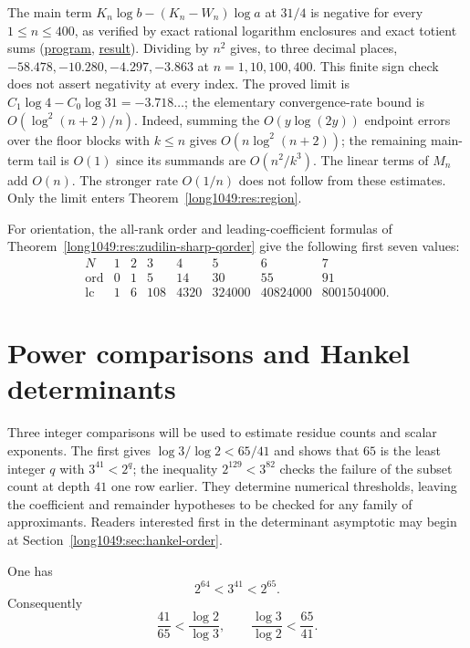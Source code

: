 The main term $K_n\log b-(K_n-W_n)\log a$ at $31/4$ is negative
for every $1\le n\le400$, as verified by exact rational logarithm
enclosures and exact totient sums (\href{https://github.com/wcook04/plectis-erdos/blob/4beca4ad0c00a626def9c73f2420e20ebf8d1968/research/experiments/erdos1049/main_term_31_4.py}{program}, \href{https://github.com/wcook04/plectis-erdos/blob/4beca4ad0c00a626def9c73f2420e20ebf8d1968/research/experiments/erdos1049/receipts/main-term-31-4.json}{result}). Dividing by $n^2$ gives, to three
decimal places, $-58.478,-10.280,-4.297,-3.863$ at
$n=1,10,100,400$. This finite sign check does not assert negativity at
every index. The proved limit is
$C_1\log4-C_0\log31=-3.718\ldots$; the elementary convergence-rate bound
is $O(\log^2(n+2)/n)$.
Indeed, summing the $O(y\log(2y))$ endpoint errors over the floor blocks
with $k\le n$ gives $O(n\log^2(n+2))$; the remaining main-term tail is
$O(1)$ since its summands are $O(n^2/k^3)$.  The linear terms of $M_n$
add $O(n)$.  The stronger rate $O(1/n)$ does not follow from these estimates.  Only the limit enters Theorem~\ref{long1049:res:region}.

For orientation, the all-rank order and leading-coefficient formulas of
Theorem~\ref{long1049:res:zudilin-sharp-qorder} give the following first seven values:
\[
\begin{array}{c|rrrrrrr}
N&1&2&3&4&5&6&7\\\hline
\operatorname{ord}&0&1&5&14&30&55&91\\
\operatorname{lc}&1&6&108&4320&324000&40824000&8001504000.
\end{array}
\]


\section{Power comparisons and Hankel determinants}\label{long1049:sec:sharp}

Three integer comparisons will be used to estimate residue counts
and scalar exponents. The first gives $\log3/\log2<65/41$ and shows
that $65$ is the least integer $q$ with $3^{41}<2^q$; the inequality
$2^{129}<3^{82}$ checks the failure of the subset count at depth $41$
one row earlier. They determine numerical thresholds, leaving the
coefficient and remainder hypotheses to be checked for any family
of approximants. Readers interested first in the determinant
asymptotic may begin at Section~\ref{long1049:sec:hankel-order}.

\begin{theorem}\label{long1049:res:powerbracket}
One has
\[
 2^{64}<3^{41}<2^{65}.
\]
Consequently
\[
 \frac{41}{65}<\frac{\log2}{\log3},
 \qquad
 \frac{\log3}{\log2}<\frac{65}{41}.
\]
\end{theorem}

